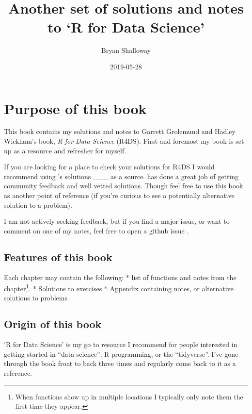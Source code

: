 \documentclass[]{book}
\title{Another set of solutions and notes to `R for Data Science'}
\author{Bryan Shalloway}
\date{2019-05-28}
\let\rmarkdownfootnote\footnote%
\def\footnote{\protect\rmarkdownfootnote}
\theoremstyle{definition}
\theoremstyle{definition}
\theoremstyle{definition}
\theoremstyle{remark}
\begin{document}
\maketitle

{
\setcounter{tocdepth}{1}
\tableofcontents
}
\hypertarget{purpose-of-this-book}{%
\chapter{Purpose of this book}\label{purpose-of-this-book}}

This book contains my solutions and notes to Garrett Grolemund and
Hadley Wickham's book, \emph{R for Data Science} (R4DS). First and
foremost my book is set-up as a resource and refresher for myself.

If you are looking for a place to check your solutions for R4DS I would
recommend using \citet{Jrnold}'s solutions \_\_\_ as a source.
\citet{Jrnold} has done a great job of getting community feedback and
well vetted solutions. Though feel free to use this book as another
point of reference (if you're curious to see a potentially alternative
solution to a problem).

I am not actively seeking feedback, but if you find a major issue, or
want to comment on one of my notes, feel free to open a github issue
\citet{brshallo}.

\hypertarget{features-of-this-book}{%
\section{Features of this book}\label{features-of-this-book}}

Each chapter may contain the following: * list of functions and notes
from the chapter\footnote{When functions show up in multiple locations I
  typically only note them the first time they appear.}. * Solutions to
exercises * Appendix containing notes, or alternative solutions to
problems

\hypertarget{origin-of-this-book}{%
\section{Origin of this book}\label{origin-of-this-book}}

`R for Data Science' is my go to resource I recommend for people
interested in getting started in ``data science'', R programming, or the
``tidyverse''. I've gone through the book front to back three times and
regularly come back to it as a reference.
\end{document}
